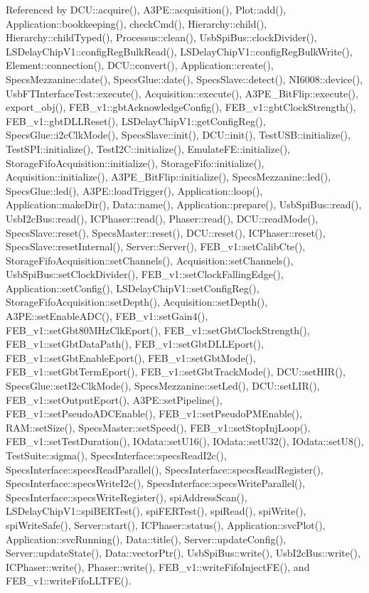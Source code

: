 Referenced by DCU::acquire(), A3PE::acquisition(), Plot::add(), Application::bookkeeping(), checkCmd(), Hierarchy::child(), Hierarchy::childTyped(), Processus::clean(), UsbSpiBus::clockDivider(), LSDelayChipV1::configRegBulkRead(), LSDelayChipV1::configRegBulkWrite(), Element::connection(), DCU::convert(), Application::create(), SpecsMezzanine::date(), SpecsGlue::date(), SpecsSlave::detect(), NI6008::device(), UsbFTInterfaceTest::execute(), Acquisition::execute(), A3PE\_\-BitFlip::execute(), export\_\-obj(), FEB\_\-v1::gbtAcknowledgeConfig(), FEB\_\-v1::gbtClockStrength(), FEB\_\-v1::gbtDLLReset(), LSDelayChipV1::getConfigReg(), SpecsGlue::i2cClkMode(), SpecsSlave::init(), DCU::init(), TestUSB::initialize(), TestSPI::initialize(), TestI2C::initialize(), EmulateFE::initialize(), StorageFifoAcquisition::initialize(), StorageFifo::initialize(), Acquisition::initialize(), A3PE\_\-BitFlip::initialize(), SpecsMezzanine::led(), SpecsGlue::led(), A3PE::loadTrigger(), Application::loop(), Application::makeDir(), Data::name(), Application::prepare(), UsbSpiBus::read(), UsbI2cBus::read(), ICPhaser::read(), Phaser::read(), DCU::readMode(), SpecsSlave::reset(), SpecsMaster::reset(), DCU::reset(), ICPhaser::reset(), SpecsSlave::resetInternal(), Server::Server(), FEB\_\-v1::setCalibCte(), StorageFifoAcquisition::setChannels(), Acquisition::setChannels(), UsbSpiBus::setClockDivider(), FEB\_\-v1::setClockFallingEdge(), Application::setConfig(), LSDelayChipV1::setConfigReg(), StorageFifoAcquisition::setDepth(), Acquisition::setDepth(), A3PE::setEnableADC(), FEB\_\-v1::setGain4(), FEB\_\-v1::setGbt80MHzClkEport(), FEB\_\-v1::setGbtClockStrength(), FEB\_\-v1::setGbtDataPath(), FEB\_\-v1::setGbtDLLEport(), FEB\_\-v1::setGbtEnableEport(), FEB\_\-v1::setGbtMode(), FEB\_\-v1::setGbtTermEport(), FEB\_\-v1::setGbtTrackMode(), DCU::setHIR(), SpecsGlue::setI2cClkMode(), SpecsMezzanine::setLed(), DCU::setLIR(), FEB\_\-v1::setOutputEport(), A3PE::setPipeline(), FEB\_\-v1::setPseudoADCEnable(), FEB\_\-v1::setPseudoPMEnable(), RAM::setSize(), SpecsMaster::setSpeed(), FEB\_\-v1::setStopInjLoop(), FEB\_\-v1::setTestDuration(), IOdata::setU16(), IOdata::setU32(), IOdata::setU8(), TestSuite::sigma(), SpecsInterface::specsReadI2c(), SpecsInterface::specsReadParallel(), SpecsInterface::specsReadRegister(), SpecsInterface::specsWriteI2c(), SpecsInterface::specsWriteParallel(), SpecsInterface::specsWriteRegister(), spiAddressScan(), LSDelayChipV1::spiBERTest(), spiFERTest(), spiRead(), spiWrite(), spiWriteSafe(), Server::start(), ICPhaser::status(), Application::svcPlot(), Application::svcRunning(), Data::title(), Server::updateConfig(), Server::updateState(), Data::vectorPtr(), UsbSpiBus::write(), UsbI2cBus::write(), ICPhaser::write(), Phaser::write(), FEB\_\-v1::writeFifoInjectFE(), and FEB\_\-v1::writeFifoLLTFE().


